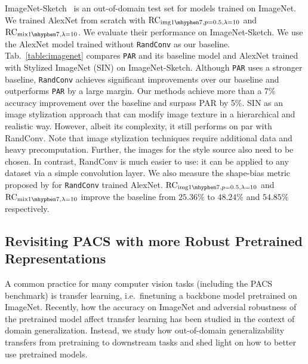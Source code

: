 \documentclass{article} \usepackage{iclr2021_conference,times}
\newcommand{\RandConv}{\texttt{RandConv}}
\begin{document}
ImageNet-Sketch~\citep{wang2019learning} is an out-of-domain test set for models trained on ImageNet. We trained AlexNet from scratch with $\text{RC}_{\text{img}1\mhyphen7, p=0.5, \lambda=10}$ and $\text{RC}_{\text{mix}1\mhyphen7,\lambda=10}$. We evaluate their performance on ImageNet-Sketch. We use the AlexNet model trained without {\RandConv} as our baseline. Tab.~\ref{table:imagenet} compares \texttt{PAR} and its baseline model and {AlexNet trained with Stylized ImageNet (SIN) \citep{geirhos2018imagenettrained} on ImageNet-Sketch.}
Although \texttt{PAR} uses a stronger baseline, {\RandConv} achieves significant improvements over our baseline and outperforms \texttt{PAR} by a large margin. Our methods achieve more than a 7\% accuracy improvement over the baseline and surpass PAR by 5\%. 
 {SIN as an image stylization approach that can modify image texture in a hierarchical and realistic way. However, albeit its complexity, it still performs on par with RandConv. Note that image stylization techniques require additional data and heavy precomputation. Further, the images for the style source also need to be chosen. In contrast, RandConv is much easier to use: it can be applied to any dataset via a simple convolution layer. We also measure the shape-bias metric proposed by
\cite{geirhos2018imagenettrained} for \texttt{RandConv} trained AlexNet. $\text{RC}_{\text{img}1\mhyphen7, p=0.5, \lambda=10}$ and $\text{RC}_{\text{mix}1\mhyphen7,\lambda=10}$ improve the baseline from $25.36\%$ to $48.24\%$ and $54.85\%$ respectively.}



\subsection{Revisiting PACS with more Robust Pretrained Representations}
\label{section:revisit_pacs}
A common practice for many computer vision tasks (including the PACS benchmark) is transfer learning, i.e.\ finetuning a backbone model pretrained on ImageNet. Recently, how the accuracy on ImageNet \citep{kornblith2019better} and adversial robustness \citep{salman2020adversarially} of the pretrained model affect transfer learning has been studied in the context of domain generalization. Instead, we study how out-of-domain generalizability transfers from pretraining to downstream tasks and shed light on how to better use pretrained models.
\end{document}
